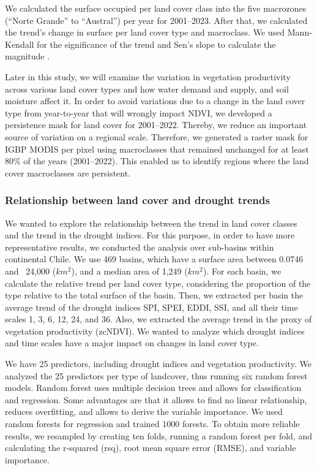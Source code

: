 \documentclass[
  authoryear,
  preprint,
  3p,
  onecolumn]{elsarticle}
\begin{document}
We calculated the surface occupied per land cover class into the five
macrozones (``Norte Grande'' to ``Austral'') per year for 2001--2023.
After that, we calculated the trend's change in surface per land cover
type and macroclass. We used Mann-Kendall for the significance of the
trend \citep{Kendall1975} and Sen's slope to calculate the magnitude
\citep{Sen1968}.

Later in this study, we will examine the variation in vegetation
productivity across various land cover types and how water demand and
supply, and soil moisture affect it. In order to avoid variations due to
a change in the land cover type from year-to-year that will wrongly
impact NDVI, we developed a persistence mask for land cover for
2001--2022. Thereby, we reduce an important source of variation on a
regional scale. Therefore, we generated a raster mask for IGBP MODIS per
pixel using macroclasses that remained unchanged for at least 80\% of
the years (2001--2022). This enabled us to identify regions where the
land cover macroclasses are persistent.

\hypertarget{relationship-between-land-cover-and-drought-trends}{%
\subsubsection{Relationship between land cover and drought
trends}\label{relationship-between-land-cover-and-drought-trends}}

We wanted to explore the relationship between the trend in land cover
classes and the trend in the drought indices. For this purpose, in order
to have more representative results, we conducted the analysis over
sub-basins within continental Chile. We use 469 basins, which have a
surface area between 0.0746 and ~24,000 (\(km^2\)), and a median area of
1,249 (\(km^2\)). For each basin, we calculate the relative trend per
land cover type, considering the proportion of the type relative to the
total surface of the basin. Then, we extracted per basin the average
trend of the drought indices SPI, SPEI, EDDI, SSI, and all their time
scales 1, 3, 6, 12, 24, and 36. Also, we extracted the average trend in
the proxy of vegetation productivity (zcNDVI). We wanted to analyze
which drought indices and time scales have a major impact on changes in
land cover type.

We have 25 predictors, including drought indices and vegetation
productivity. We analyzed the 25 predictors per type of landcover, thus
running six random forest models. Random forest uses multiple decision
trees and allows for classification and regression. Some advantages are
that it allows to find no linear relationship, reduces overfitting, and
allows to derive the variable importance. We used random forests for
regression and trained 1000 forests. To obtain more reliable results, we
resampled by creating ten folds, running a random forest per fold, and
calculating the r-squared (rsq), root mean square error (RMSE), and
variable importance.
\end{document}

